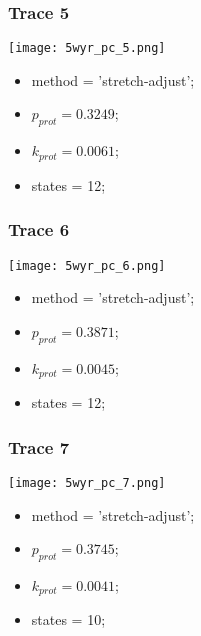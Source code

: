 \subsubsection{Trace 5}
\begin{minipage}[c]{0.7\textwidth}
    \texttt{[image: 5wyr\_pc\_5.png]}
\end{minipage}
\hfill
\begin{minipage}[c]{0.45\textwidth}
    \begin{itemize}
        \item method = 'stretch-adjust';
        \item $p_{prot}=0.3249$;
        \item $k_{prot}=0.0061$;
        \item states = 12;
    \end{itemize}
\end{minipage}

\subsubsection{Trace 6}
\begin{minipage}[c]{0.7\textwidth}
    \texttt{[image: 5wyr\_pc\_6.png]}
\end{minipage}
\hfill
\begin{minipage}[c]{0.45\textwidth}
    \begin{itemize}
        \item method = 'stretch-adjust';
        \item $p_{prot}=0.3871$;
        \item $k_{prot}=0.0045$;
        \item states = 12;
    \end{itemize}
\end{minipage}

\subsubsection{Trace 7}
\begin{minipage}[c]{0.7\textwidth}
    \texttt{[image: 5wyr\_pc\_7.png]}
\end{minipage}
\hfill
\begin{minipage}[c]{0.45\textwidth}
    \begin{itemize}
        \item method = 'stretch-adjust';
        \item $p_{prot}=0.3745$;
        \item $k_{prot}=0.0041$;
        \item states = 10;
    \end{itemize}
\end{minipage}

